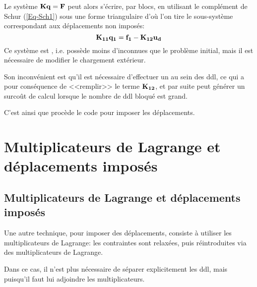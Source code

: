 \medskip
Le système $\mathbf{K}\mathbf{q}=\mathbf{F}$ peut alors s'écrire, par blocs, en utilisant le complément de Schur (\ref{Eq-Sch1}) sous une
forme triangulaire d'où l'on tire le sous-système correspondant aux déplacements non imposés:
\begin{equation}
\mathbf{K_{11}}\mathbf{q_1} = \mathbf{f_1} - \mathbf{K_{12}}\mathbf{u_d}
\end{equation}
\medskipvm
Ce système est , i.e. possède moins d'inconnues que le problème initial, mais il est nécessaire de
modifier le chargement extérieur.

Son inconvénient est qu'il est nécessaire d'effectuer un  au sein des ddl, ce qui a pour conséquence de 
<<remplir>> le terme $\mathbf{K_{12}}$, et par suite peut générer un surcoût de calcul lorsque le nombre de ddl bloqué
est grand.

C'est ainsi que procède le code \abaqus pour imposer les déplacements.

\medskip
\ifVersionAvecExemplesSepares
   \section{Multiplicateurs de Lagrange et déplacements imposés}\label{Sec-cast}
\else
   \subsection{Multiplicateurs de Lagrange et déplacements imposés}\label{Sec-cast}
\fi

Une autre technique, pour imposer des déplacements, consiste à utiliser les multiplicateurs de Lagrange: les contraintes sont relaxées, puis réintroduites via des multiplicateurs de Lagrange.

Dans ce cas, il n'est plus nécessaire de séparer explicitement les ddl, mais  puisqu'il faut lui adjoindre les multiplicateurs.

